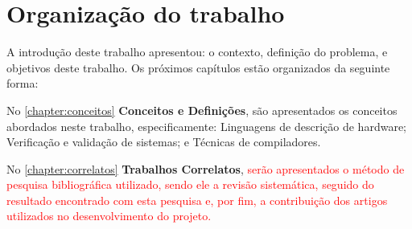 % 


\section{Organização do trabalho}
A introdução deste trabalho apresentou: o contexto, definição do problema, e objetivos deste trabalho. Os próximos capítulos estão organizados da seguinte forma:

\par
No \autoref{chapter:conceitos} \textbf{Conceitos e Definições}, são apresentados os conceitos abordados neste trabalho, especificamente: Linguagens de descrição de hardware; Verificação e validação de sistemas; e Técnicas de compiladores.

\par
No \autoref{chapter:correlatos} \textbf{Trabalhos Correlatos}, \textcolor{red}{serão apresentados o método de pesquisa bibliográfica utilizado, sendo ele a revisão sistemática, seguido do resultado encontrado com esta pesquisa e, por fim, a contribuição dos artigos utilizados no desenvolvimento do projeto.} 

